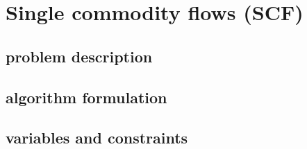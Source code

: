 \section{Single commodity flows (SCF)}

\subsection{problem description}

\subsection{algorithm formulation}

\subsection{variables and constraints}
